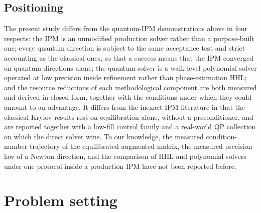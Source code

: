 \documentclass[11pt]{article}
\theoremstyle{definition}
\begin{document}
\subsection{Positioning}
The present study differs from the quantum-IPM demonstrations above in four respects: the IPM is an unmodified production solver rather than a purpose-built one; every quantum direction is subject to the same acceptance test and strict accounting as the classical ones, so that a success means that the IPM converged on quantum directions alone; the quantum solver is a walk-level polynomial solver operated at low precision inside refinement rather than phase-estimation HHL; and the resource reductions of each methodological component are both measured and derived in closed form, together with the conditions under which they could amount to an advantage. It differs from the inexact-IPM literature in that the classical Krylov results rest on equilibration alone, without a preconditioner, and are reported together with a low-fill control family and a real-world QP collection on which the direct solver wins. To our knowledge, the measured condition-number trajectory of the equilibrated augmented matrix, the measured precision law of a Newton direction, and the comparison of HHL and polynomial solvers under one protocol inside a production IPM have not been reported before.

\section{Problem setting}\label{sec:setting}
\end{document}
